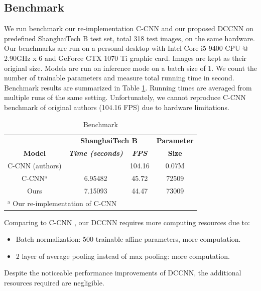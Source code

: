 
\subsection{Benchmark}

We run benchmark our re-implementation C-CNN \cite{9053780} and our proposed DCCNN on predefined ShanghaiTech B test set, total 318 test images, on the same hardware. Our benchmarks are run on a personal desktop with Intel Core i5-9400 CPU @ 2.90GHz x 6 and GeForce GTX 1070 Ti graphic card. Images are kept as their original size. Models are run on inference mode on a batch size of 1. We count the number of trainable parameters and measure total running time in second. Benchmark results are summarized in Table \ref{tab:benchmark-result}. Running times are averaged from multiple runs of the same setting. Unfortunately, we cannot reproduce C-CNN benchmark of original authors \cite{9053780} (104.16 FPS) due to hardware limitations. 

\begin{table}[htbp]
\caption{\label{tab:benchmark-result}  Benchmark}
\begin{center}
\begin{tabular}{|c|c|c|c|}
\hline
\textbf{}&\multicolumn{2}{|c|}{\textbf{ShanghaiTech B}}&\textbf{Parameter} \\
\cline{1-3}
\textbf{Model} & \textbf{\textit{ Time (seconds) }}& \textbf{\textit{FPS}}&\textbf{Size} \\
\hline
C-CNN (authors) \cite{9053780} &  &  104.16 & 0.07M \\
\hline
C-CNN$^{\mathrm{a}}$  & 6.95482 & 45.72 & 72509   \\
\hline
Ours &  7.15093 & 44.47 & 73009 \\
\hline
\multicolumn{4}{l}{$^{\mathrm{a}}$ Our re-implementation of C-CNN \cite{9053780}}
\end{tabular}

\end{center}
\end{table}

Comparing to C-CNN \cite{9053780}, our DCCNN requires more computing resources due to: 
\begin{itemize}
    \item Batch normalization: 500 trainable affine parameters, more computation.
    \item 2 layer of average pooling instead of max pooling: more computation. 
\end{itemize}

Despite the noticeable performance improvements of DCCNN, the additional resources required are negligible.